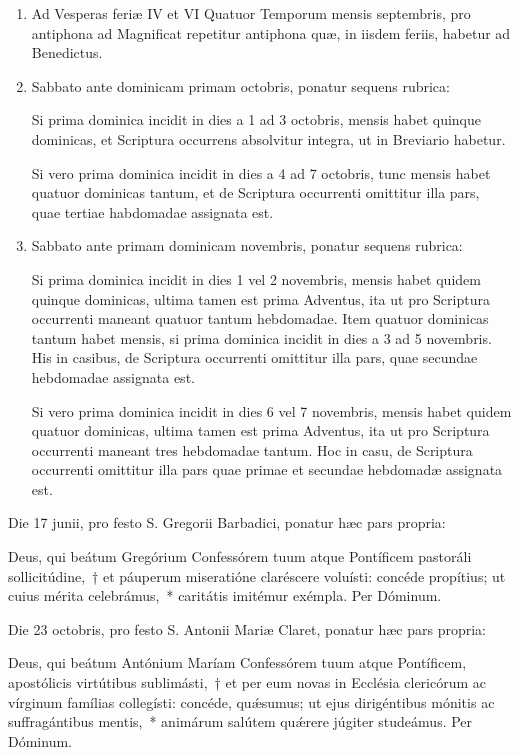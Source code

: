 \documentclass[vesperale_romanum.tex]{subfiles}
\begin{document}
\begin{enumerate}[nosep,start=37]
\item Ad Vesperas feriæ IV et VI Quatuor Temporum mensis septembris, pro antiphona ad Magnificat repetitur antiphona quæ, in iisdem feriis, habetur ad Benedictus.


\item Sabbato ante dominicam primam octobris, ponatur sequens rubrica: 

\quad Si prima dominica incidit in dies a 1 ad 3 octobris, mensis habet quinque dominicas, et Scriptura occurrens absolvitur integra, ut in Breviario habetur.

\quad Si vero prima dominica incidit in dies a 4 ad 7 octobris, tunc mensis habet quatuor dominicas tantum, et de Scriptura occurrenti omittitur illa pars, quae tertiae habdomadae assignata est.
%

\item Sabbato ante primam dominicam novembris, ponatur sequens rubrica:

\quad Si prima dominica incidit in dies 1 vel 2 novembris, mensis habet quidem quinque dominicas, ultima tamen est prima Adventus, ita ut pro Scriptura occurrenti maneant quatuor tantum hebdomadae. Item quatuor dominicas tantum habet mensis, si prima dominica incidit in dies a 3 ad 5 novembris. His in casibus, de Scriptura occurrenti omittitur illa pars, quae secundae hebdomadae assignata est. 

\quad Si vero prima dominica incidit in dies 6 vel 7 novembris, mensis habet quidem quatuor dominicas, ultima tamen est prima Adventus, ita ut pro Scriptura occurrenti maneant tres hebdomadae tantum. Hoc in casu, de Scriptura occurrenti omittitur illa pars quae primae et secundae hebdomadæ assignata est.


\end{enumerate}

 Die 17 junii, pro festo S. Gregorii Barbadici, ponatur hæc pars propria:
 
\noindent Deus, qui beátum Gregórium Confessórem tuum atque Pontíficem pastoráli sollicitúdine,~† et páuperum miseratióne claréscere voluísti: concéde propítius; ut cuius mérita celebrámus,~* caritátis imitémur exémpla.
Per Dóminum.

Die 23 octobris, pro festo S. Antonii Mariæ Claret, ponatur hæc pars propria:

\noindent Deus, qui beátum Antónium Maríam Confessórem tuum atque Pontíficem, apostólicis virtútibus sublimásti,~† et per eum novas in Ecclésia clericórum ac vírginum famílias collegísti: concéde, quǽsumus; ut ejus dirigéntibus mónitis ac suffragántibus mentis,~* animárum salútem quǽrere júgiter studeámus.
Per Dóminum.
\end{document}
